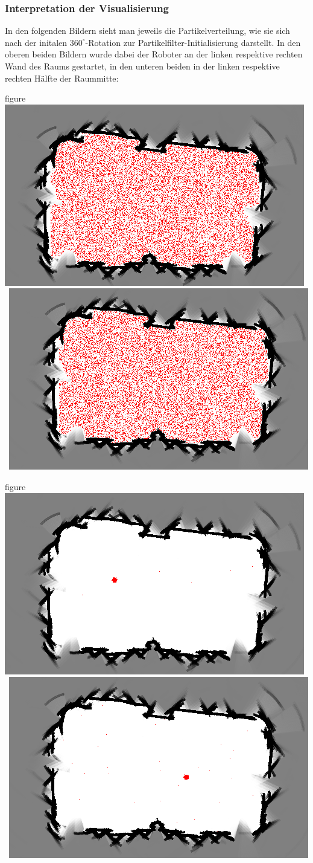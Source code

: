 \subsubsection{Interpretation der Visualisierung}
In den folgenden Bildern sieht man jeweils die Partikelverteilung, wie
sie sich nach der initalen $360^{\circ}$-Rotation zur
Partikelfilter-Initialisierung darstellt. In den oberen beiden Bildern
wurde dabei der Roboter an der linken respektive rechten Wand des
Raums gestartet, in den unteren beiden in der linken respektive
rechten Hälfte der Raummitte:
\begin{nofloat}{figure}
 \includegraphics[width=0.5\linewidth]{bilder/visualisierung/visualisierung2}
 \
 \includegraphics[width=0.5\linewidth]{bilder/visualisierung/visualisierung3}
 \caption{Partikelverteilung im Partikelfilter bei Start nahe der Wände}
\end{nofloat}
\begin{nofloat}{figure}
 \includegraphics[width=0.5\linewidth]{bilder/visualisierung/visualisierung4}
 \
 \includegraphics[width=0.5\linewidth]{bilder/visualisierung/visualisierung5}
  \caption{Partikelverteilung im Partikelfilter bei Start in der Raummitte}
\end{nofloat} 

